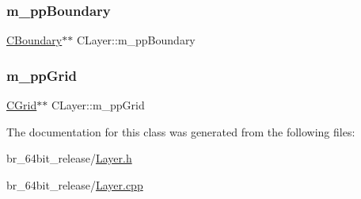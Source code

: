 \subsubsection{\texorpdfstring{m\_ppBoundary}{m\_ppBoundary}}
{\footnotesize\ttfamily \mbox{\hyperlink{classCBoundary}{C\+Boundary}}$\ast$$\ast$ C\+Layer\+::m\+\_\+pp\+Boundary\hspace{0.3cm}{\ttfamily [protected]}}

\mbox{\label{classCLayer_acaee54a8cb6a0dc8a924ad8dc7800f78}} 
\subsubsection{\texorpdfstring{m\_ppGrid}{m\_ppGrid}}
{\footnotesize\ttfamily \mbox{\hyperlink{classCGrid}{C\+Grid}}$\ast$$\ast$ C\+Layer\+::m\+\_\+pp\+Grid\hspace{0.3cm}{\ttfamily [protected]}}



The documentation for this class was generated from the following files\+:\begin{DoxyCompactItemize}
\item 
br\+\_\+64bit\+\_\+release/\mbox{\hyperlink{Layer_8h}{Layer.\+h}}\item 
br\+\_\+64bit\+\_\+release/\mbox{\hyperlink{Layer_8cpp}{Layer.\+cpp}}\end{DoxyCompactItemize}
